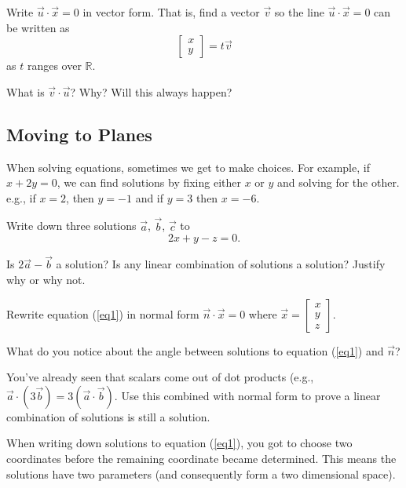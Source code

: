 \documentclass{article}
\newcommand{\R}{\mathbb{R}}
\begin{document}
	\begin{Enum}
		\item Write $\vec u\cdot \vec x=0$ in vector form.  That is, find a vector $\vec v$ so
		the line $\vec u\cdot \vec x=0$  can be written as
		\[
			\begin{bmatrix}x\\y\end{bmatrix} = t\vec v
		\]
		as $t$ ranges over $\R$.
		\item What is $\vec v\cdot \vec u$? Why? Will this always happen?
	\end{Enum}

	\subsection*{Moving to Planes}
	When solving equations, sometimes we get to make choices. For example, 
	if $x+2y=0$, we can find solutions by fixing either $x$ or $y$ and solving
	for the other. e.g., if $x=2$, then $y=-1$ and if $y=3$ then $x=-6$.

	\begin{Enum}
		\item Write down three solutions $\vec a$, $\vec b$, $\vec c$ to
		\begin{equation}\label{eq1}
			2x+y-z=0.
		\end{equation}
		\item Is $2\vec a-\vec b$ a solution?  Is any linear combination of solutions a solution?  Justify why or why not.
		\item Rewrite equation (\ref{eq1}) in normal form $\vec n\cdot \vec x=0$ where $\vec x=\begin{bmatrix}x\\ y\\ z\end{bmatrix}$.
		\item What do you notice about the angle between solutions to equation (\ref{eq1}) and $\vec n$?
		\item You've already seen that scalars come out of dot products (e.g., $\vec a\cdot(3\vec b) = 3(\vec a\cdot \vec b)$.
		Use this combined with normal form to prove a linear combination of solutions is still a solution.
	\end{Enum}

	When writing down solutions to equation (\ref{eq1}), you got to choose two coordinates before the remaining
	coordinate became determined.  This means the solutions have two parameters (and consequently form a
	two dimensional space).
\end{document}
